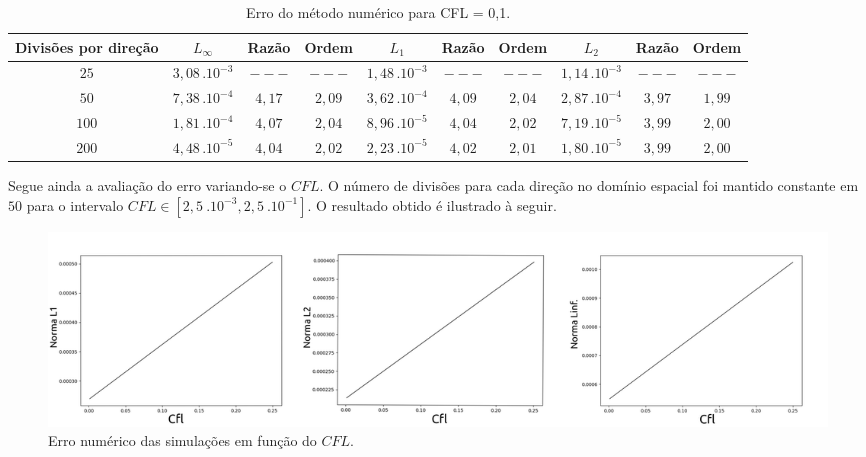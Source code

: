 \documentclass[10pt,twoside,a4paper]{article}
\begin{document}
	\begin{table}[h!]
		\caption{Erro do método numérico para CFL = 0,1.}
		\label{tabela1}
		\centering
		\begin{tabular}{c | c c c | c c c | c c c}
			\hline
			Divisões por direção   &  $L_\infty$       	& Razão   	 & Ordem   & $L_{1}$ 				& Razão 	  & Ordem &  $L_{2}$       	& Razão   	 & Ordem \\ \hline
			
			
			
			$25$ 				   & $3,08 \, . 10^{-3}$      & $---$   &       $---$   & $1,48 \, . 10^{-3}$       & $---$    	&  $---$     & $1,14 \, . 10^{-3}$      & $---$   & $---$ \\ 
			
			
			$50$ 				  & $7,38 \, . 10^{-4}$      & $4,17$   &       $2,09$  & $3,62 \, . 10^{-4}$       & $4,09$   					&		$2,04$     & $2,87 \, . 10^{-4}$      & $3,97$   & $1,99$\\ 
			
			
			$100$ 				  & $1,81 \, . 10^{-4}$      & $4,07$   &       $2,04$  & $8,96 \, . 10^{-5}$       & $4,04$    		&		$2,02$     & $7,19 \, . 10^{-5}$      & $3,99$   & $2,00$\\ 
			
			
			$200$ 				   & $4,48 \, . 10^{-5}$      & $4,04$   &       $2,02$  & $2,23 \, . 10^{-5}$       & $4,02$    				&		$2, 01$     & $1,80 \, . 10^{-5}$      & $3,99$   & $2,00$\\
			 \hline
		\end{tabular}

	\end{table}
\vspace*{-2mm}
	
	Segue ainda a avaliação do erro variando-se o $CFL$. O número de divisões para cada direção no domínio espacial foi mantido constante em $50$ para o intervalo $CFL \in [2,5 \ .10^{-3} , 2,5 \ .10^{-1}]$. O resultado obtido é ilustrado à seguir.
	
	\vspace*{-4mm}
	
	\begin{figure}[!hbt]
		\centering
		\includegraphics[scale=0.3]{NormaL1.png}
		\vspace*{-5mm}
		\caption{Erro numérico das simulações em função do $CFL$.}
		\label{fig:erro}
	\end{figure}
\end{document}
